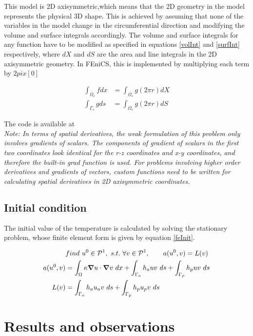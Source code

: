\documentclass{article}
\begin{document}
This model is 2D axisymmetric,which means that the 2D geometry in the model represents the physical 3D shape. This is achieved by assuming that none of the variables in the model change in the circumferential direction and modifying the volume and surface integrals accordingly. The volume and surface integrals for any function have to be modified as specified in equations \ref{volInt} and \ref{surfInt} respectively, where $dX$ and $dS$ are the area and line integrals in the 2D axisymmetric geometry. In FEniCS, this is implemented by multiplying each term by $2 pi x[0]$

\begin{align}
\int_{\Omega_s} f dx &= \int_{\Omega_s} g (2 \pi r) dX \label{volInt} \\
\int_{\Gamma_s} g ds &= \int_{\Omega_s} g (2 \pi r) dS \label{surfInt}
\end{align}


The code is available at \\

\textit{Note: In terms of spatial derivatives, the weak formulation of this problem only involves gradients of scalars. The components of gradient of scalars in the first two coordinates look identical for the r-z coordinates and x-y coordinates, and therefore the built-in grad function is used. For problems involving higher order derivatives and gradients of vectors, custom functions need to be written for calculating spatial derivatives in 2D axisymmetric coordinates.}

\subsection{Initial condition}
The initial value of the temperature is calculated by solving the stationary problem, whose finite element form is given by equation \ref{feInit}.  

\begin{align}
&find ~u^0 \in \mathcal{P}^1,~s.t.~ \forall v \in \mathcal{P}^1, \qquad  a(u^0,v) = L(v) \label{feInit} \\
a(u^0,v) &= \int_\Omega\kappa\grad u \cdot \grad v ~dx  + \int_{\Gamma_a} h_a u v ~ds + \int_{\Gamma_p} h_p u v ~ds \label{initBilinear} \\
L(v) &= \int_{\Gamma_a} h_a u_a v ~ds + \int_{\Gamma_p} h_p u_p v ~ds \label{initLinear}
\end{align}

\section{Results and observations}
\end{document}
